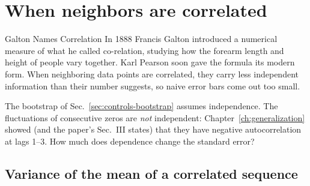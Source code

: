 \section{When neighbors are correlated}\label{sec:controls-serial}
\begin{didyouknow}{Galton Names Correlation}
In 1888 Francis Galton introduced a numerical measure of what he called co-relation, studying how the forearm length and height of people vary together. Karl Pearson soon gave the formula its modern form. When neighboring data points are correlated, they carry less independent information than their number suggests, so naive error bars come out too small.
\end{didyouknow}

The bootstrap of Sec.~\ref{sec:controls-bootstrap} assumes independence. The fluctuations of consecutive zeros are \emph{not} independent: Chapter~\ref{ch:generalization} showed (and the paper's Sec.~III states) that they have negative autocorrelation at lags 1--3. How much does dependence change the standard error?

\subsection{Variance of the mean of a correlated sequence}


